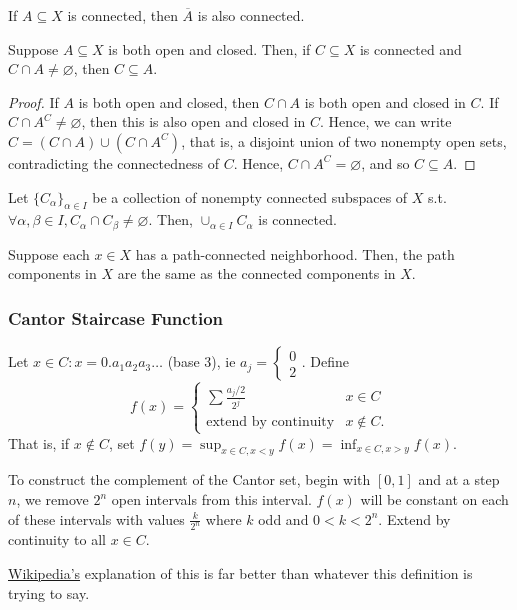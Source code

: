 \begin{lemma}
    If $A \subseteq X$ is connected, then $\overline{A}$ is also connected.
\end{lemma}

\begin{lemma}
    Suppose $A \subseteq X$ is both open and closed. Then, if $C\subseteq X$ is connected and $C \cap A \neq \varnothing$, then $C \subseteq A$.
\end{lemma}
\begin{proof}
    If $A$ is both open and closed, then $C \cap A$ is both open and closed in $C$. If $C \cap A^C \neq \varnothing$, then this is also open and closed in $C$. Hence, we can write $C = (C \cap A) \cup (C \cap A^C)$, that is, a disjoint union of two nonempty open sets, contradicting the connectedness of $C$. Hence, $C \cap A^C = \varnothing$, and so $C \subseteq A$.
\end{proof}

\begin{proposition}
    Let $\{C_\alpha\}_{\alpha \in I}$ be a collection of nonempty connected subspaces of $X$ s.t. $\forall \alpha, \beta \in I, C_\alpha \cap C_\beta \neq \varnothing$. Then, $\cup_{\alpha \in I} C_\alpha$ is connected.
\end{proposition}

\begin{proposition}
    Suppose each $x \in X$ has a path-connected neighborhood. Then, the path components in $X$ are the same as the connected components in $X$.
\end{proposition}

\subsubsection{Cantor Staircase Function}
\begin{definition}
    Let $x \in C : x = 0. a_1 a_2 a_3 \dots$ (base 3), ie $a_j = \begin{cases}
        0\\
        2
    \end{cases}$. Define \[
    f(x) = \begin{cases}
        \sum \frac{a_j/2}{2^j} & x \in C\\
        \text{extend by continuity} & x \notin C.
    \end{cases}
    \]
    That is, if $x \notin C$, set $f(y)= \sup_{x \in C, x < y} f(x) = \inf_{x \in C, x > y} f(x)$.
\end{definition}

\begin{definition}
    To construct the complement of the Cantor set, begin with $[0, 1]$ and at a step $n$, we remove $2^n$ open intervals from this interval. $f(x)$ will be constant on each of these intervals with values $\frac{k}{2^n}$ where $k$ odd and $0 < k < 2^n$. Extend by continuity to all $x \in C$.
\end{definition}

\begin{remark}
    \href{https://en.wikipedia.org/wiki/Cantor_function}{Wikipedia's} explanation of this is far better than whatever this definition is trying to say.
\end{remark}

